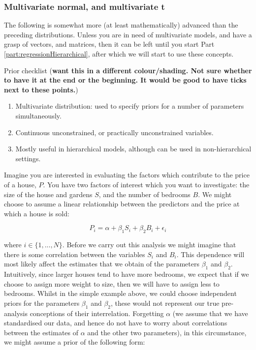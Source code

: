 \documentclass[11pt,fullpage]{book}
\begin{document}
\subsubsection{Multivariate normal, and multivariate t}
The following is somewhat more (at least mathematically) advanced than the preceding distributions. Unless you are in need of multivariate models, and have a grasp of vectors, and matrices, then it can be left until you start Part \ref{part:regressionHierarchical}, after which we will start to use these concepts.

Prior checklist (\textbf{want this in a different colour/shading. Not sure whether to have it at the end or the beginning. It would be good to have ticks next to these points.})

\begin{enumerate}
\item Multivariate distribution: used to specify priors for a number of parameters simultaneously.
\item Continuous unconstrained, or practically unconstrained variables.
\item Mostly useful in hierarchical models, although can be used in non-hierarchical settings.
\end{enumerate}

Imagine you are interested in evaluating the factors which contribute to the price of a house, $P$. You have two factors of interest which you want to investigate: the size of the house and gardens $S$, and the number of bedrooms $B$. We might choose to assume a linear relationship between the predictors and the price at which a house is sold:

\begin{equation}
P_i = \alpha + \beta_1 S_i + \beta_2 B_i + \epsilon_i
\end{equation}

where $i\in \{1,...,N\}$. Before we carry out this analysis we might imagine that there is some correlation between the variables $S_i$ and $B_i$. This dependence will most likely affect the estimates that we obtain of the parameters $\beta_1$ and $\beta_2$. Intuitively, since larger houses tend to have more bedrooms, we expect that if we choose to assign more weight to size, then we will have to assign less to bedrooms. Whilst in the simple example above, we could choose independent priors for the parameters $\beta_1$ and $\beta_2$, these would not represent our true pre-analysis conceptions of their interrelation. Forgetting $\alpha$ (we assume that we have standardised our data, and hence do not have to worry about correlations between the estimates of $\alpha$ and the other two parameters), in this circumstance, we might assume a prior of the following form:
\end{document}
